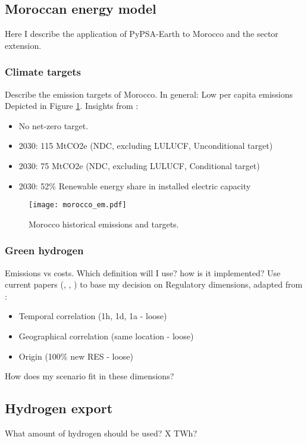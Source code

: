 
\subsection{Moroccan energy model}
Here I describe the application of PyPSA-Earth \cite{Parzen2022} to Morocco and the sector extension.
\subsubsection{Climate targets}
Describe the emission targets of Morocco. In general: Low per capita emissions
Depicted in Figure \ref{fig:morocco_em}.
Insights from \cite{CAT2021}:
\begin{itemize}
    \item No net-zero target.
    \item 2030: 115 MtCO2e (NDC, excluding LULUCF, Unconditional target)
    \item 2030: 75 MtCO2e (NDC, excluding LULUCF, Conditional target)
    \item 2030: 52\% Renewable energy share in installed electric capacity
\end{itemize}



\begin{figure}[h!]
    \centering
    \texttt{[image: morocco\_em.pdf]}
    \caption{Morocco historical emissions and targets.}
    \label{fig:morocco_em}
\end{figure}




\subsubsection{Green hydrogen}
Emissions vs costs. Which definition will I use? how is it implemented?
Use current papers (\cite{Brauer2022}, \cite{Ruhnau2022}, \cite{Zeyen2022a}) to base my decision on
Regulatory dimensions, adapted from \cite{Brauer2022}:
\begin{itemize}
    \item Temporal correlation (1h, 1d, 1a - loose) 
    \item Geographical correlation (same location - loose)
    \item Origin (100\% new RES - loose)
\end{itemize}
How does my scenario fit in these dimensions?
\subsection{Hydrogen export}
What amount of hydrogen should be used? X TWh?
